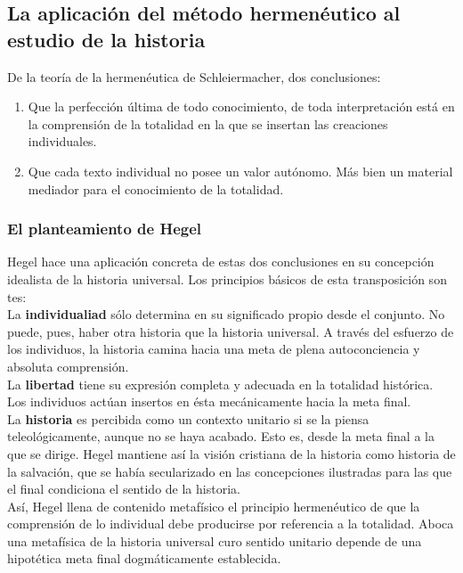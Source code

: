 \documentclass[a4paper, 11pt, twocolumn, spanish]{article}
\begin{document}
\subsection{La aplicación del método hermenéutico al estudio de la historia}
\label{sec:orgbeede22}
De la teoría de la hermenéutica de Schleiermacher, dos conclusiones:
\begin{enumerate}
\item Que la perfección última de todo conocimiento, de toda
interpretación está en la comprensión de la totalidad en la que
se insertan las creaciones individuales.
\item Que cada texto individual no posee un valor autónomo. Más bien un
material mediador para el conocimiento de la totalidad.
\end{enumerate}


\subsubsection{El planteamiento de Hegel}
\label{sec:orgd3d0d70}
Hegel hace una aplicación concreta de estas dos conclusiones en su
concepción idealista de la historia universal. Los principios básicos
de esta transposición son tes:\\[0pt]
La \textbf{individualiad} sólo determina en su significado propio desde el
conjunto. No puede, pues, haber otra historia que la historia
universal. A través del esfuerzo de los individuos, la historia camina
hacia una meta de plena autoconciencia y absoluta comprensión.\\[0pt]
La \textbf{libertad} tiene su expresión completa y adecuada en la totalidad
histórica. Los individuos actúan insertos en ésta mecánicamente hacia
la meta final.\\[0pt]
La \textbf{historia} es percibida como un contexto unitario si se la piensa
teleológicamente, aunque no se haya acabado. Esto es, desde la meta
final a la que se dirige. Hegel mantiene así la visión cristiana de la
historia como historia de la salvación, que se había secularizado en
las concepciones ilustradas para las que el final condiciona el
sentido de la historia.\\[0pt]

Así, Hegel llena de contenido metafísico el principio hermenéutico de
que la comprensión de lo individual debe producirse por referencia a
la totalidad. Aboca una metafísica de la historia universal curo
sentido unitario depende de una hipotética meta final dogmáticamente
establecida.
\end{document}
